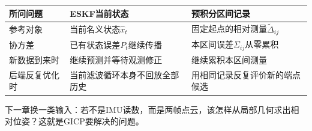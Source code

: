 \begin{center}\small\begin{tabular}{p{}p{}p{}}\toprule

所问问题 & ESKF当前状态 & 预积分区间记录 \\

\midrule

参考对象 & 当前名义状态$\hat x_t$ & 固定起点的相对测量$\widetilde\Delta_{ij}$ \\

协方差 & 已有状态误差$P_t$继续传播 & 本区间误差$\Sigma_{ij}$从零累积 \\

新数据到来时 & 继续预测并等待观测修正 & 继续累积本区间测量 \\

后端反复优化时 & 当前滤波循环本身不回放全部历史 & 用相同记录反复评价新的端点候选 \\

\bottomrule\end{tabular}\end{center}

下一章换一类输入：若不是IMU读数，而是两帧点云，该怎样从局部几何求出相对位姿？这就是GICP要解决的问题。
